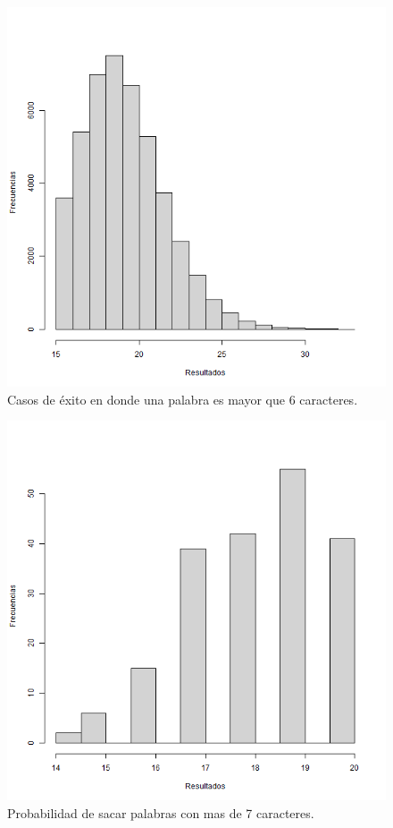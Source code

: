 \documentclass[]{article}
\begin{document}
\begin{figure}[b]
    \centering
    \includegraphics[width=.5\linewidth]{Negativo.png}    \caption{Casos de éxito en donde una palabra es mayor que 6 caracteres.}
    \label{fig:Negativo}
\end{figure}
\begin{figure}[b]
    \centering
    \includegraphics[width=.5\linewidth]{Regular.png}    \caption{Probabilidad de sacar palabras con mas de 7 caracteres.}
    \label{fig:Regular}
\end{figure}


\printbibliography[title={Referencias}]
\end{document}
